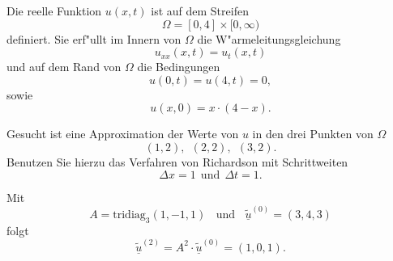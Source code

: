 Die reelle Funktion $u(x,t)$ ist auf dem Streifen
\[
\Omega = [0, 4] \times [0,\infty)
\]
definiert. Sie erf"ullt im Innern von $\Omega$ die W"armeleitungsgleichung
\[
u_{xx}(x,t) = u_{t}(x,t)
\]
und auf dem Rand von $\Omega$ die Bedingungen
\[
u(0,t) = u(4,t) = 0,
\]
sowie
\[
u(x,0) = x \cdot (4-x).
\]

\vspace{1mm}

Gesucht ist eine Approximation der Werte von $u$ in den drei Punkten von
$\Omega$
\[
(1,2), \ \  (2,2), \ \ (3,2).
\]
Benutzen Sie hierzu das Verfahren von Richardson mit Schrittweiten
\[
\Delta x = 1 \ \ \mbox{und} \ \  \Delta t = 1.
\]


\begin{loesung}
Mit
\[
A = \mbox{tridiag}_3(1,-1,1) \ \ \ \ \mbox{und}  \ \ \ \ \underline{\tilde u}^{(0)} = (3, 4, 3)
\]
folgt
\[
\underline{\tilde u}^{(2)} = A^2 \cdot \underline{\tilde u}^{(0)} = (1, 0, 1).
\]
\end{loesung}
